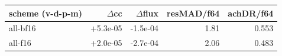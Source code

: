 \begin{tabular}{lrrrr}
\toprule
scheme (v-d-p-m) & $\Delta$cc & $\Delta$flux & resMAD/f64 & achDR/f64 \\
\midrule
all-bf16 & +5.3e-05 & -1.5e-04 & 1.81 & 0.553 \\
all-f16 & +2.0e-05 & -2.7e-04 & 2.06 & 0.483 \\
\bottomrule
\end{tabular}